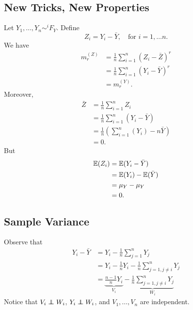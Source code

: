     \subsection{New Tricks, New Properties}
    Let $Y_1,\dots, Y_n \sim^i F_Y$. Define
    $$Z_i=Y_i-\bar Y, \quad \text{for } i=1,\dots n.$$
	We have
    \begin{align*}
			m_r^{(Z)}&=\frac{1}{n}\sum^n_{i=1}(Z_i-\bar Z)^r\\
        &=\frac{1}{n}\sum^n_{i=1}(Y_i-\bar Y)^r \\
		&=m_r^{(Y)}.
    \end{align*}
    Moreover,
    \begin{align*}
			\bar Z&=\frac{1}{n}\sum_{i=1}^n Z_i \\
        &=\frac{1}{n}\sum^n_{i=1}(Y_i-\bar Y)\\
        &=\frac{1}{n}\left(\sum^n_{i=1}(Y_i) -n\bar Y\right)\\
        &=0.
    \end{align*}
    But \begin{align*}
        \mathbb E(Z_i)&=\mathbb E(Y_i-\bar Y) \\
        &=\mathbb E(Y_i)-\mathbb E(\bar Y) \\
        &=\mu_Y-\mu_Y \\
        &=0.
    \end{align*}
    \subsection{Sample Variance}
    Observe that
    \begin{align*}
        Y_i-\bar Y &=Y_i-\frac1n\sum^n_{j=1}Y_j \\
        &=Y_i-\frac{1}{n}Y_i-\frac{1}{n}\sum^n_{j=1, j\neq i}Y_j \\
        &=\underbrace{\frac{n-1}{n}Y_i}_{V_i}-\underbrace{\frac{1}{n}\sum^n_{j=1, j\neq i}Y_j}_{W_i}
    \end{align*}
    Notice that $V_i\ind W_i$, $Y_i\ind W_i$, and $V_1,\dots, V_n$ are independent. 
    
